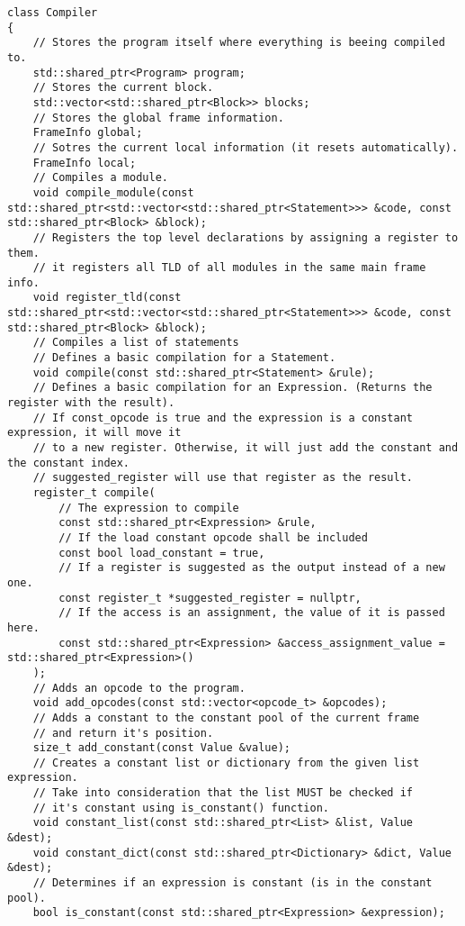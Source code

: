 \begin{code}
\begin{verbatim}
class Compiler
{
    // Stores the program itself where everything is beeing compiled to.
    std::shared_ptr<Program> program;
    // Stores the current block.
    std::vector<std::shared_ptr<Block>> blocks;
    // Stores the global frame information.
    FrameInfo global;
    // Sotres the current local information (it resets automatically).
    FrameInfo local;
    // Compiles a module.
    void compile_module(const std::shared_ptr<std::vector<std::shared_ptr<Statement>>> &code, const std::shared_ptr<Block> &block);
    // Registers the top level declarations by assigning a register to them.
    // it registers all TLD of all modules in the same main frame info.
    void register_tld(const std::shared_ptr<std::vector<std::shared_ptr<Statement>>> &code, const std::shared_ptr<Block> &block);
    // Compiles a list of statements
    // Defines a basic compilation for a Statement.
    void compile(const std::shared_ptr<Statement> &rule);
    // Defines a basic compilation for an Expression. (Returns the register with the result).
    // If const_opcode is true and the expression is a constant expression, it will move it
    // to a new register. Otherwise, it will just add the constant and the constant index.
    // suggested_register will use that register as the result.
    register_t compile(
        // The expression to compile
        const std::shared_ptr<Expression> &rule,
        // If the load constant opcode shall be included
        const bool load_constant = true,
        // If a register is suggested as the output instead of a new one.
        const register_t *suggested_register = nullptr,
        // If the access is an assignment, the value of it is passed here.
        const std::shared_ptr<Expression> &access_assignment_value = std::shared_ptr<Expression>()
    );
    // Adds an opcode to the program.
    void add_opcodes(const std::vector<opcode_t> &opcodes);
    // Adds a constant to the constant pool of the current frame
    // and return it's position.
    size_t add_constant(const Value &value);
    // Creates a constant list or dictionary from the given list expression.
    // Take into consideration that the list MUST be checked if
    // it's constant using is_constant() function.
    void constant_list(const std::shared_ptr<List> &list, Value &dest);
    void constant_dict(const std::shared_ptr<Dictionary> &dict, Value &dest);
    // Determines if an expression is constant (is in the constant pool).
    bool is_constant(const std::shared_ptr<Expression> &expression);

\end{verbatim}
\end{code}
